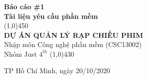 \documentclass[a4paper, 12pt]{article}
\begin{document}
    \begin{titlepage}
        \begin{center}

            \vspace*{1cm}
            \Large\textbf{Báo cáo \#1\\Tài liệu yêu cầu phần mềm}\\

            \vfill
            \line(1,0){450}\\[4mm]
            \LARGE\textbf{\MakeUppercase{Dự án quản lý rạp chiếu phim}}\\[3mm]
            \Large{Nhập môn Công nghệ phần mềm (CSC13002)}\\[3mm]
            \Large{Nhóm Just $4^{th}$}
            \line(1,0){430}\\
            \vfill

            \vfill
            TP Hồ Chí Minh, ngày 20/10/2020
        \end{center}
    \end{titlepage}

    \tableofcontents
    \thispagestyle{empty}
    \clearpage
\end{document}
